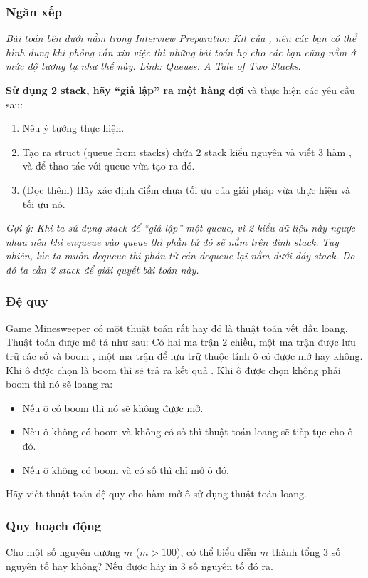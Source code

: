 \documentclass[main.tex]{subfiles}
\begin{document}
\subsubsection{Ngăn xếp}
\textit{Bài toán bên dưới nằm trong Interview Preparation Kit của , nên các bạn có thể hình dung khi phỏng vấn xin việc thì những bài toán họ cho các bạn cũng nằm ở mức độ tương tự như thế này. Link: \href{https://www.hackerrank.com/challenges/ctci-queue-using-two-stacks}{Queues: A Tale of Two Stacks}}.

\textbf{Sử dụng 2 stack, hãy ``giả lập'' ra một hàng đợi} và thực hiện các yêu cầu sau:
\begin{enumerate}[label=\alph*.]
    \item Nêu ý tưởng thực hiện.
    \item Tạo ra struct  (queue from stacks) chứa 2 stack kiểu nguyên và viết 3 hàm ,  và   để thao tác với queue vừa tạo ra đó.
    \item (Đọc thêm) Hãy xác định điểm chưa tối ưu của giải pháp vừa thực hiện và tối ưu nó.
\end{enumerate}
\textit{Gợi ý: Khi ta sử dụng stack để ``giả lập'' một queue, vì 2 kiểu dữ liệu này ngược nhau nên khi enqueue vào queue thì phần tử đó sẽ nằm trên đỉnh stack. Tuy nhiên, lúc ta muốn dequeue thì phần tử cần dequeue lại nằm dưới đáy stack. Do đó ta cần 2 stack để giải quyết bài toán này.}

\subsubsection{Đệ quy}
Game Minesweeper có một thuật toán rất hay đó là thuật toán vết dầu loang. Thuật toán được mô tả như sau:
Có hai ma trận 2 chiều, một ma trận  được lưu trữ các số và boom , một ma trận  để lưu trữ thuộc tính ô có được mở hay không.
Khi ô được chọn là boom thì sẽ trả ra kết quả .   
Khi ô được chọn không phải boom thì nó sẽ loang ra:  
\begin{itemize}
    \item Nếu ô có boom thì nó sẽ không được mở.
    \item Nếu ô không có boom và không có số thì thuật   toán loang sẽ tiếp tục cho ô đó.
    \item Nếu ô không có boom và có số thì chỉ mở ô đó.
\end{itemize}
Hãy viết thuật toán đệ quy cho hàm mở ô sử dụng thuật toán loang.

\subsubsection{Quy hoạch động}
Cho một số nguyên dương $m$ ($m>100$), có thể biểu diễn $m$ thành tổng 3 số nguyên tố hay không? Nếu được hãy in 3 số nguyên tố đó ra. 
\end{document}
